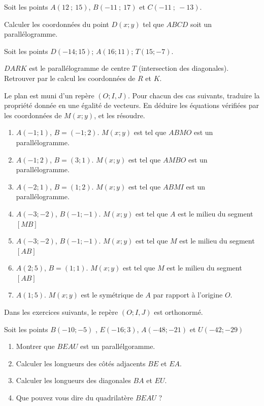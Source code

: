 \newpage
\begin{exercise} \label{chapter06:exercices:parallelogrammes03}
	Soit les points $A(12~;~15)$, $B(-11~;~17)$ et $C(-11~;~-13)$. 
	
	Calculer les coordonnées du point $D(x;y)$ tel que $ABCD$ soit un parallélogramme.
\end{exercise}  
\begin{exercise}\label{chapter06:exercices:parallelogrammes04} Soit les points   $D(-14;15)$; $A(16;11)$; $T(15;-7)$. 
	
	$DARK$ est le parallélogramme de centre $T$ (intersection des diagonales). Retrouver par le calcul les coordonnées de $R$ et $K$. 
\end{exercise}
\begin{exercise}[Variations]\label{chapter06:exercices:parallelogrammes05} 
	Le plan est muni d'un repère $(O;I,J)$.  Pour chacun des cas suivants, traduire la propriété donnée en une égalité de vecteurs. En déduire les équations vérifiées par les coordonnées de $M(x;y)$, et les résoudre.
	\begin{enumerate}[label=\alph*)]
		\item $A(-1;1)$, $B = ( -1; 2)$. $M(x;y)$ est tel que $ABMO$ est un parallélogramme.
		\item  $A( -1; 2)$, $B = (3; 1)$.  $M(x;y)$ est tel que $AMBO$ est un parallélogramme.
		\item  $A(-2;1)$, $B = (1;2)$.  $M(x;y)$ est tel que $ABMI$ est un parallélogramme.
		\item $A(-3;-2)$, $B(-1;-1)$. $M(x;y)$ est tel que $A$ est le milieu du segment $[MB]$
		\item $A(-3;-2)$, $B(-1;-1)$. $M(x;y)$ est tel que $M$ est le milieu du segment $[AB]$ 
		\item $A(2;5)$, $B = (1; 1)$. $M(x;y)$ est tel que $M$ est le milieu du segment $[AB]$ 
		\item $A(1;5)$. $M(x;y)$ est le symétrique de $A$ par rapport à l'origine $O$.
	\end{enumerate}
\end{exercise}  
\begin{eBox}
	Dans les exercices suivants, le repère $(O;I,J)$ est orthonormé.
\end{eBox} 
\begin{exercise} Soit les points $B(-10;-5)$ , $E(-16;3)$, $A(-48;-21)$ et $U(-42;-29)$
	\begin{enumerate}[label=\alph*), leftmargin=*]\label{chapter06:exercice:naturequadrilatere01}
		\item Montrer que $BEAU$ est un parallélgoramme.
		\item Calculer les longueurs des côtés adjacents $BE$ et $EA$.
		\item Calculer les longueurs des diagonales $BA$ et $EU$. 
		\item Que pouvez vous dire du quadrilatère $BEAU$ ?
	\end{enumerate}
\end{exercise}
